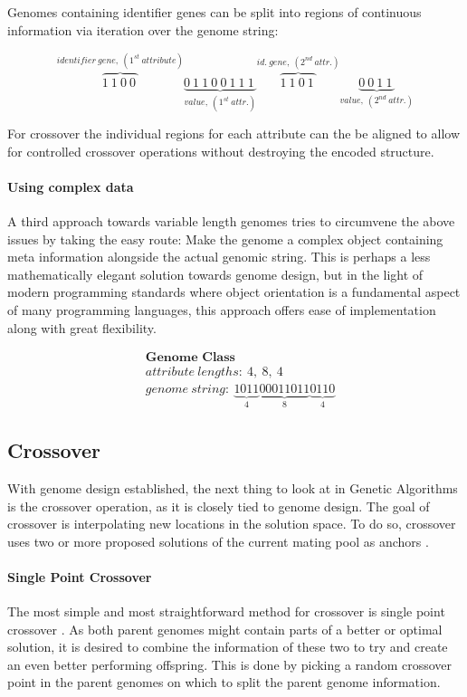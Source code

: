 \documentclass[11pt,a4paper,twoside,openright]{scrbook}
\begin{document}
Genomes containing identifier genes can be split into regions of continuous information via iteration over the genome string:

\[\overbrace{1\ 1\ 0\ 0\ }^{identifier\ gene,\ (1^{st}\ attribute)}\underbrace{0\ 1\ 1\ 0\ 0\ 1\ 1\ 1\ }_{value,\ (1^{st}\ attr.)}\overbrace{1\ 1\ 0\ 1\ }^{id.\ gene,\ (2^{nd}\ attr.)}\underbrace{0\ 0\ 1\ 1\ }_{value,\ (2^{nd}\ attr.)}\]

For crossover the individual regions for each attribute can the be aligned to allow for controlled crossover operations without destroying the encoded structure.

\paragraph{Using complex data}
A third approach towards variable length genomes tries to circumvene the above issues by taking the easy route: Make the genome a complex object containing meta information alongside the actual genomic string. This is perhaps a less mathematically elegant solution towards genome design, but in the light of modern programming standards where object orientation is a fundamental aspect of many programming languages, this approach offers ease of implementation along with great flexibility.

\begin{equation*}
  \boxed{
    \begin{aligned}
    & \textbf{Genome Class} \\
    & attribute\ lengths:\ 4,\ 8,\ 4 \\
    & genome\ string:\ \underbrace{1011}_4 \underbrace{00011011}_8 \underbrace{0110}_4
  \end{aligned}
  }
\end{equation*}

\subsection{Crossover}
With genome design established, the next thing to look at in Genetic Algorithms is the crossover operation, as it is closely tied to genome design. The goal of crossover is interpolating new locations in the solution space. To do so, crossover uses two or more proposed solutions of the current mating pool as anchors \cite{Haupt98}.

\paragraph{Single Point Crossover}
The most simple and most straightforward method for crossover is single point crossover \cite[p.\,65]{Holland75}.
As both parent genomes might contain parts of a better or optimal solution, it is desired to combine the information of these two to try and create an even better performing offspring. This is done by picking a random crossover point in the parent genomes on which to split the parent genome information.
\end{document}
